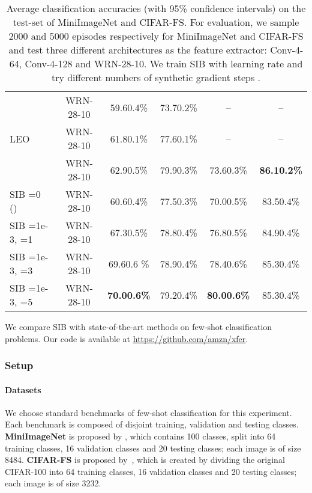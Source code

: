 \documentclass{article} \usepackage{iclr2020_conference,times}
\begin{document}
\begin{table}[t]
{\begin{tabular}{ p{4.35cm} c c c c c }
\citet{qiao2018few} & WRN-28-10 & 59.60.4\% & 73.70.2\% & -- & --\\
LEO~\citep{rusu2018metalearning} & WRN-28-10 & 61.80.1\% & 77.60.1\% & -- & -- \\
\citet{gidaris2019boosting} & WRN-28-10 & 62.90.5\% & 79.90.3\% & 73.60.3\% & \textbf{86.10.2\%} \\ \hline

\rowcolor[gray]{.9} SIB =0 () & WRN-28-10 & 60.60.4\% & 77.50.3\% & 70.00.5\% & 83.50.4\% \\
\rowcolor[gray]{.9} SIB =1e-3, =1 & WRN-28-10 & 67.30.5\% & 78.80.4\% & 76.80.5\%& 84.90.4\%\\
\rowcolor[gray]{.9} SIB =1e-3, =3 & WRN-28-10 & 69.60.6 \% & 78.90.4\% & 78.40.6\% & 85.30.4\%\\
\rowcolor[gray]{.9} SIB =1e-3, =5 & WRN-28-10 & \textbf{70.00.6\%} & 79.20.4\% & \textbf{80.00.6\%}& 85.30.4\% \\

\bottomrule
\end{tabular}}
\caption{Average classification accuracies (with 95\% confidence intervals) on the test-set of MiniImageNet and CIFAR-FS. 
    For evaluation, we sample 2000 and 5000 episodes respectively for MiniImageNet and CIFAR-FS 
    and test three different architectures as the feature extractor: Conv-4-64, Conv-4-128 and WRN-28-10. 
    We train SIB with learning rate  and try different numbers of synthetic gradient steps .}
\label{tab:tab-1}
\end{table}


We compare SIB with state-of-the-art methods on few-shot classification problems.
Our code is available at \url{https://github.com/amzn/xfer}.

\subsubsection{Setup}

\paragraph{Datasets}
We choose standard benchmarks of few-shot classification for this experiment.
Each benchmark is composed of disjoint training, validation and testing classes. 
\textbf{MiniImageNet} is proposed by \citet{vinyals2016matching}, which contains 100 classes, 
split into 64 training classes, 16 validation classes and 20 testing classes;
each image is of size 8484. 
\textbf{CIFAR-FS} is proposed by~\citet{Bertinetto2018MetalearningWD}, 
which is created by dividing the original CIFAR-100 into 
64 training classes, 16 validation classes and 20 testing classes; 
each image is of size 3232.
\end{document}
